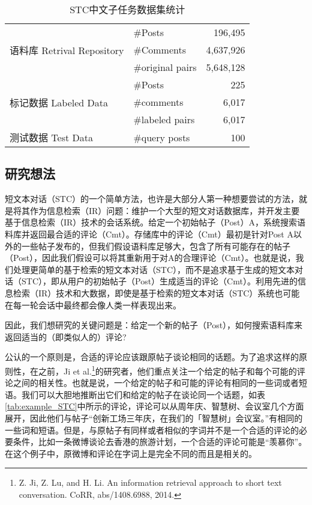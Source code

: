 \begin{table}[htbp]
\centering
\caption{STC中文子任务数据集统计} \label{tab:statistics_STC}
\begin{tabular}{|p{4cm}|l|r|}
    \hline
    \multirow{3}{4cm}{语料库 \linebreak Retrival Repository} & \#Posts & 196,495 \\ 
	\cline{2-3}
	& \#Comments & 4,637,926 \\ 
	\cline{2-3}
	& \#original pairs & 5,648,128 \\ 
	\hline
	\multirow{3}{4cm}{标记数据 \linebreak Labeled Data} & \#Posts & 225 \\ 
	\cline{2-3}
	& \#comments & 6,017 \\ 
	\cline{2-3}
	& \#labeled pairs & 6,017 \\ 
	\hline
	测试数据 Test Data & \#query posts & 100 \\
	\hline
\end{tabular}
\end{table}
	

\subsection{研究想法}
短文本对话（STC）的一个简单方法，也许是大部分人第一种想要尝试的方法，就是将其作为信息检索（IR）问题：维护一个大型的短文对话数据库，并开发主要基于信息检索（IR）技术的会话系统。给定一个初始帖子（Post）A，系统搜索语料库并返回最合适的评论（Cmt）。存储库中的评论（Cmt）最初是针对Post A以外的一些帖子发布的，但我们假设语料库足够大，包含了所有可能存在的帖子（Post），因此我们假设可以将其重新用于对A的合理评论（Cmt）。也就是说，我们处理更简单的基于检索的短文本对话（STC），而不是追求基于生成的短文本对话（STC），即从用户的初始帖子（Post）生成适当的评论（Cmt）。利用先进的信息检索（IR）技术和大数据，即使是基于检索的短文本对话（STC）系统也可能在每一轮会话中最终都会像人类一样表现出来。

因此，我们想研究的关键问题是：给定一个新的帖子（Post），如何搜索语料库来返回适当的（即类似人的）评论?

公认的一个原则是，合适的评论应该跟原帖子谈论相同的话题。为了追求这样的原则性，在之前，Ji et al.\footnote{Z. Ji, Z. Lu, and H. Li. An information retrieval approach to short text conversation. CoRR, abs/1408.6988, 2014.}的研究者，他们重点关注一个给定的帖子和每个可能的评论之间的相关性。也就是说，一个给定的帖子和可能的评论有相同的一些词或者短语。我们可以大胆地推断出它们和给定的帖子在谈论同一个话题，如表\ref{tab:example_STC}中所示的评论，评论可以从周年庆、智慧树、会议室几个方面展开，因此他们与帖子“创新工场三年庆，在我们的「智慧树」会议室。”有相同的一些词和短语。但是，与原帖子有同样或者相似的字词并不是一个合适的评论的必要条件，比如一条微博谈论去香港的旅游计划，一个合适的评论可能是“羡慕你”。在这个例子中，原微博和评论在字词上是完全不同的而且是相关的。


